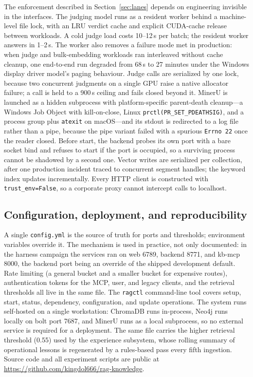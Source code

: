 The enforcement described in Section~\ref{sec:lanes} depends on engineering
invisible in the interfaces. The judging model runs as a resident worker
behind a machine-level file lock, with an LRU verdict cache and explicit
CUDA-cache release between workloads. A cold judge load costs 10--12\,s per
batch; the resident worker answers in 1--2\,s. The worker also removes a
failure mode met in production: when judge and bulk-embedding workloads ran
interleaved without cache cleanup, one end-to-end run degraded from 68\,s to
27 minutes under the Windows display driver model's paging behaviour. Judge
calls are serialized by one lock, because two concurrent judgments on a
single GPU raise a native allocator failure; a call is held to a 900\,s
ceiling and fails closed beyond it. MinerU
is launched as a hidden subprocess with platform-specific parent-death
cleanup---a Windows Job Object with kill-on-close, Linux
\texttt{prctl(PR\_SET\_PDEATHSIG)}, and a process group plus
\texttt{atexit} on macOS---and its stdout is redirected to a log file rather
than a pipe, because the pipe variant failed with a spurious
\texttt{Errno 22} once the reader closed. Before start, the backend probes
its own port with a bare socket bind and refuses to start if the port is
occupied, so a surviving process cannot be shadowed by a second one. Vector
writes are serialized per collection, after one production incident traced
to concurrent segment handles; the keyword index updates incrementally.
Every HTTP client is constructed with \texttt{trust\_env=False}, so a
corporate proxy cannot intercept calls to localhost.

\subsection{Configuration, deployment, and reproducibility}
\label{sec:impl-deploy}

A single \texttt{config.yml} is the source of truth for ports and
thresholds; environment variables override it. The mechanism is used in
practice, not only documented: in the harness campaign the services ran on
web 6789, backend 8771, and kb-mcp 8000, the backend port being an override
of the shipped development default. Rate limiting (a general bucket and a
smaller bucket for expensive routes), authentication tokens for the MCP,
user, and legacy clients, and the retrieval thresholds all live in the same
file. The \texttt{ragctl} command-line tool covers setup, start, status,
dependency, configuration, and update operations. The system runs
self-hosted on a single workstation: ChromaDB runs in-process, Neo4j runs
locally on bolt port 7687, and MinerU runs as a local subprocess, so no
external service is required for a deployment. The same file carries the
higher retrieval threshold (0.55) used by the experience subsystem, whose
rolling summary of operational lessons is regenerated by a rules-based pass
every fifth ingestion. Source code and all experiment scripts are public at
\url{https://github.com/kingdol666/rag-knowledge}.
